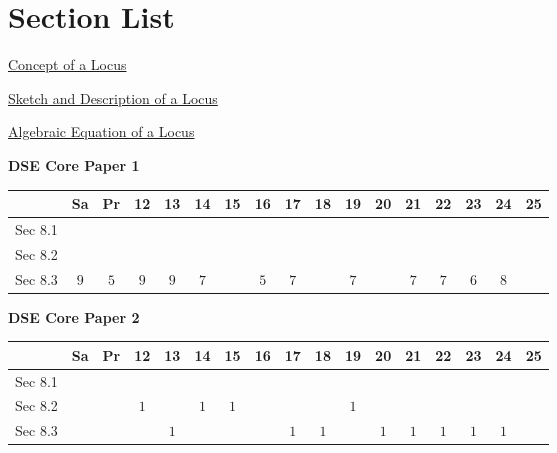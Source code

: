 \documentclass[12pt, a4paper]{article}
\begin{document}
\section*{Section List}
\begin{enumx}[label=Sec 8.\arabic*\ ]
\item \hyperref[section:5-8-1]{Concept of a Locus}
\item \hyperref[section:5-8-2]{Sketch and Description of a Locus}
\item \hyperref[section:5-8-3]{Algebraic Equation of a Locus}
\end{enumx}
\begin{absolutelynopagebreak}
\begin{center}
\textbf{DSE Core Paper 1}
\end{center}
\begin{center}
\begin{tabular}{|l|c|c|c|c|c|c|c|c|c|c|c|c|c|c|c|c|}
\hline
        & Sa & Pr & 12 & 13 & 14 & 15 & 16 & 17 & 18 & 19 & 20 & 21 & 22 & 23 & 24 & 25 \\\hline\hline
Sec 8.1 &  &  &  &  &  &  &  &  &  &  &  &  &  &  &  &  \\\hline
Sec 8.2 &  &  &  &  &  &  &  &  &  &  &  &  &  &  &  &  \\\hline
Sec 8.3 &  $9$ &  $5$ &  $9$ &  $9$ &  $7$ &  &  $5$ &  $7$ &  &  $7$ &  &  $7$ &  $7$ &  $6$ &  $8$ &  \\\hline
\end{tabular}
\end{center}
\end{absolutelynopagebreak}
\begin{absolutelynopagebreak}
\begin{center}
\textbf{DSE Core Paper 2}
\end{center}
\begin{center}
\begin{tabular}{|l|c|c|c|c|c|c|c|c|c|c|c|c|c|c|c|c|}
\hline
        & Sa & Pr & 12 & 13 & 14 & 15 & 16 & 17 & 18 & 19 & 20 & 21 & 22 & 23 & 24 & 25 \\\hline\hline
Sec 8.1 &  &  &  &  &  &  &  &  &  &  &  &  &  &  &  &  \\\hline
Sec 8.2 &  &  &  $1$ &  &  $1$ &  $1$ &  &  &  &  $1$ &  &  &  &  &  &  \\\hline
Sec 8.3 &  &  &  &  $1$ &  &  &  &  $1$ &  $1$ &  &  $1$ &  $1$ &  $1$ &  $1$ &  $1$ &  \\\hline
\end{tabular}
\end{center}
\end{absolutelynopagebreak}
\end{document}
